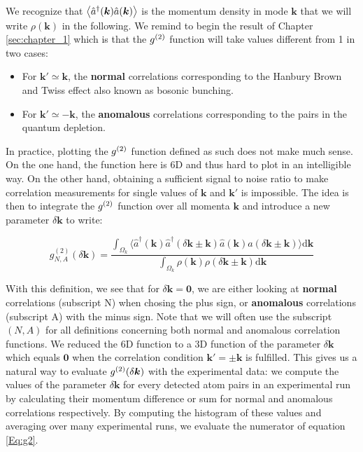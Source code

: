 \noindent We recognize that $\left\langle\hat{a}^{\dagger}(\bm{k}) \hat{a}(\bm{k})\right\rangle$ is the momentum density in mode $\bm{k}$ that we will write $\rho(\bm{k})$ in the following. We remind to begin the result of Chapter \ref{sec:chapter_1} which is that the $g^{(2)}$ function will take values different from 1 in two cases:

\begin{itemize}
    \item For $\bm{k'} \simeq \bm{k}$, the \textbf{normal} correlations corresponding to the Hanbury Brown and Twiss effect also known as bosonic bunching.
    \item For $\bm{k'} \simeq -\bm{k}$, the \textbf{anomalous} correlations corresponding to the \kmk pairs in the quantum depletion.
\end{itemize}

In practice, plotting the $g^{(2)}$ function defined as such does not make much sense. On the one hand, the function here is 6D and thus hard to plot in an intelligible way. On the other hand, obtaining a sufficient signal to noise ratio to make correlation measurements for single values of $\bm{k}$ and $\bm{k'}$ is impossible. The idea is then to integrate the $g^{(2)}$ function over all momenta $\bm{k}$ and introduce a new parameter $\delta \bm{k}$ to write:

\begin{equation}
    g_{N,A}^{(2)} (\delta {\bm k})=\frac{\int_{\Omega_{k}} \langle \hat{a}^{\dagger}({\bm k}) \hat{a}^{\dagger}(\delta {\bm k} \pm {\bm k}) \hat{a}({\bm k}) \hat{a}(\delta {\bm k} \pm {\bm k}) \rangle \mathrm{d}{\bm k}}{\int_{\Omega_{k}} \rho({\bm k}) \rho(\delta {\bm k} \pm {\bm k}) \mathrm{d}\bm{k}}
    \label{Eq:g2}
\end{equation}

\noindent With this definition, we see that for $\delta \bm{k}=\bm{0}$, we are either looking at \textbf{normal} \kk correlations (subscript N) when chosing the plus sign, or \textbf{anomalous} \kmk correlations (subscript A) with the minus sign. Note that we will often use the subscript $(N,A)$ for all definitions concerning both normal and anomalous correlation functions. We reduced the 6D function to a 3D function of the parameter $\delta \bm{k}$ which equals $\bm{0}$ when the correlation condition $\bm{k'} = \pm \bm{k}$ is fulfilled. This gives us a natural way to evaluate $g^{(2)} (\delta \bm{k})$ with the experimental data: we compute the values of the parameter $\delta \bm{k}$ for every detected atom pairs in an experimental run by calculating their momentum difference or sum for normal and anomalous correlations respectively. By computing the histogram of these values and averaging over many experimental runs, we evaluate the numerator of equation \ref{Eq:g2}.

